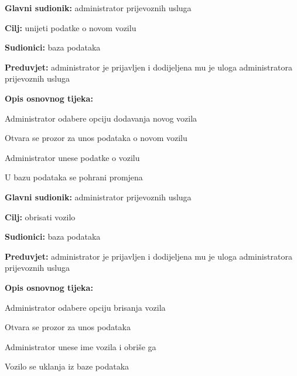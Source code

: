                         \noindent {}
					\begin{packed_item}
	
						\item \textbf{Glavni sudionik: }administrator prijevoznih usluga
						\item  \textbf{Cilj:} unijeti podatke o novom vozilu
						\item  \textbf{Sudionici:} baza podataka
						\item  \textbf{Preduvjet:} administrator je prijavljen i dodijeljena mu je uloga administratora prijevoznih usluga
						\item  \textbf{Opis osnovnog tijeka:}
						
						\item[] \begin{packed_enum}
	
							\item Administrator odabere opciju dodavanja novog vozila
							\item Otvara se prozor za unos podataka o novom vozilu
							\item Administrator unese podatke o vozilu
							\item U bazu podataka se pohrani promjena
						\end{packed_enum}
						
						
					\end{packed_item}

                        \noindent {}
					\begin{packed_item}
	
						\item \textbf{Glavni sudionik: }administrator prijevoznih usluga
						\item  \textbf{Cilj:} obrisati vozilo
						\item  \textbf{Sudionici:} baza podataka
						\item  \textbf{Preduvjet:} administrator je prijavljen i dodijeljena mu je uloga administratora prijevoznih usluga
						\item  \textbf{Opis osnovnog tijeka:}
						
						\item[] \begin{packed_enum}
	
							\item Administrator odabere opciju brisanja vozila
							\item Otvara se prozor za unos podataka
							\item Administrator unese ime vozila i obriše ga
							\item Vozilo se uklanja iz baze podataka
						\end{packed_enum}
						
						
					\end{packed_item}

